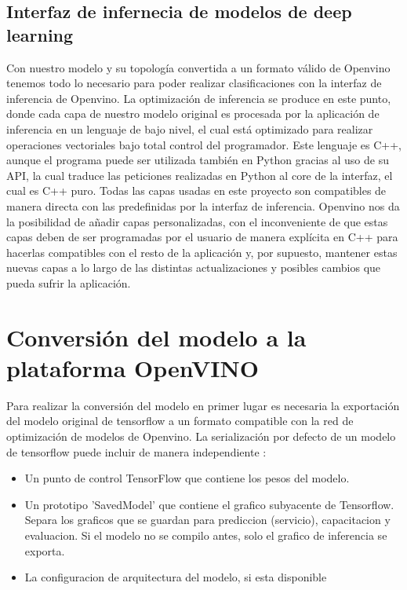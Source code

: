 \subsection{Interfaz de infernecia de modelos de deep learning}\label{subsec:interfaz-de-infernecia-de-modelos-de-deep-learning}
Con nuestro modelo y su topología convertida a un formato válido de Openvino tenemos todo lo necesario para poder realizar clasificaciones con la interfaz de inferencia de Openvino.
La optimización de inferencia se produce en este punto, donde cada capa de nuestro modelo original es procesada por la aplicación de inferencia en un lenguaje de bajo nivel, el cual está optimizado
para realizar operaciones vectoriales bajo total control del programador.
Este lenguaje es C++, aunque el programa puede ser utilizada también en Python gracias al uso de su API, la cual traduce las peticiones realizadas en Python al core de la interfaz, el cual es C++ puro.
Todas las capas usadas en este proyecto son compatibles de manera directa con las predefinidas por la interfaz de inferencia.
Openvino nos da la posibilidad de añadir capas personalizadas, con el inconveniente de que estas capas deben de ser programadas por el usuario de manera explícita en C++ para hacerlas compatibles con el resto de la aplicación y, por supuesto, mantener estas
nuevas capas a lo largo de las distintas actualizaciones y posibles cambios que pueda sufrir la aplicación.


\section{Conversión del modelo a la plataforma OpenVINO}\label{sec:conversión-del-modelo-a-la-plataforma-openvino}
Para realizar la conversión del modelo en primer lugar es necesaria la exportación del modelo original de tensorflow a un formato compatible con la red de optimización de modelos de Openvino.
La serialización por defecto de un modelo de tensorflow puede incluir de manera independiente :

\begin{itemize}
    \item Un punto de control TensorFlow que contiene los pesos del modelo.
    \item Un prototipo 'SavedModel' que contiene el grafico subyacente de Tensorflow.
    Separa los graficos que se guardan para prediccion (servicio), capacitacion y evaluacion.
    Si el modelo no se compilo antes, solo el grafico de inferencia se exporta.
    \item La configuracion de arquitectura del modelo, si esta disponible
\end{itemize}

